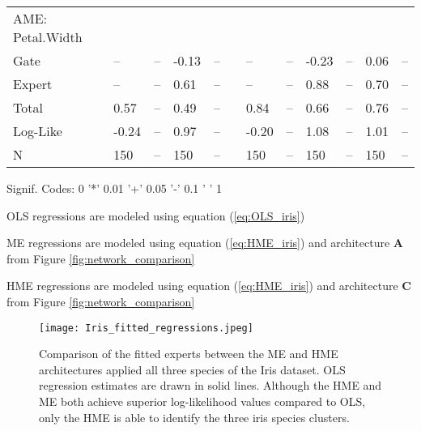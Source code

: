 \documentclass[12pt]{article}
\theoremstyle{definition}
\begin{document}
\begin{landscape}
\begin{table}
\begin{threeparttable}
\begin{tabular}[l]{l l l l l l l l l l l l}
  AME: Petal.Width \\
  \cmidrule(r){1-1}
  Gate               & --   & --     & -0.13 & --        && --    & --     & -0.23 & --     & 0.06  & --           \\
  Expert             & --   & --     &  0.61 & --        && --    & --     &  0.88 & --     & 0.70  & --           \\
  Total              & 0.57 & --     &  0.49 & --        && 0.84  & --     &  0.66 & --     & 0.76  & --           \\[0.3cm]


  Log-Like           & -0.24 & --    & 0.97  & --      && -0.20  & --    & 1.08 & --     & 1.01  & --            \\
  N                  & 150   & --    & 150   & --      && 150    & --    & 150  & --     & 150   & --            \\

	\hline
		\end{tabular}
		\begin{tablenotes}
			\item{\footnotesize Signif. Codes: 0 '*' 0.01 '+' 0.05 '-' 0.1 ' ' 1}
			\item{\footnotesize OLS regressions are modeled using equation (\ref{eq:OLS_iris})}
			\item{\footnotesize ME regressions are modeled using equation (\ref{eq:HME_iris}) and architecture $\boldsymbol{A}$ from Figure \ref{fig:network_comparison}}
			\item{\footnotesize HME regressions are modeled using equation (\ref{eq:HME_iris}) and architecture $\boldsymbol{C}$ from Figure \ref{fig:network_comparison}}
		\end{tablenotes} \label{tbl:Iris}
	\end{threeparttable}
\end{table}
\end{landscape}


\begin{figure}[!ht]
  \texttt{[image: Iris\_fitted\_regressions.jpeg]}
  \caption{Comparison of the fitted experts between the ME and HME architectures   applied all three species of the Iris dataset. OLS regression estimates are drawn in solid lines. Although the HME and ME both achieve superior log-likelihood values compared to OLS, only the HME is able to identify the three iris species clusters.}
  \label{fig:Iris_fitted_regressions}
\end{figure}
\end{document}
